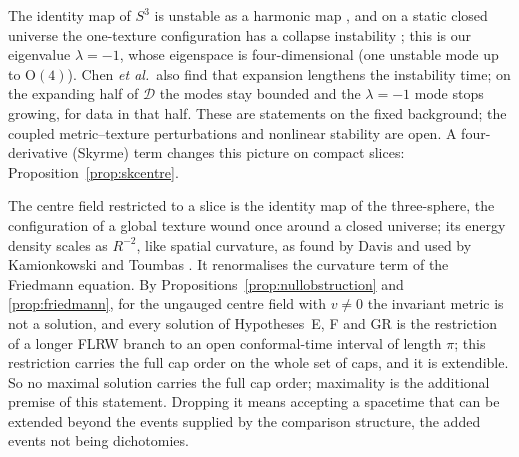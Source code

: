 \documentclass[aps,pra,onecolumn,superscriptaddress,nofootinbib,10pt]{revtex4-2}
\theoremstyle{definition}
\theoremstyle{remark}
\newcommand{\cD}{\mathcal{D}}
\newcommand{\OO}{\mathrm{O}}
\begin{document}
The identity map of $S^3$ is unstable as a harmonic map \cite{SmithHarmonic,Xin80}, and on a static
closed universe the one-texture configuration has a collapse instability \cite{CHKL97}; this is our
eigenvalue $\lambda=-1$, whose eigenspace is four-dimensional (one unstable mode up to $\OO(4)$).  Chen
\emph{et al.}\ also find that expansion lengthens the instability time; on the expanding half of $\cD$ the
modes stay bounded and the $\lambda=-1$ mode stops growing, for data in that half.  These are statements on
the fixed background; the coupled metric--texture perturbations and nonlinear stability are open.  A
four-derivative (Skyrme) term changes this picture on compact slices: Proposition~\ref{prop:skcentre}.

The centre field restricted to a slice is the identity map of the three-sphere, the configuration of
a global texture wound once around a closed universe; its energy density scales as $R^{-2}$, like
spatial curvature, as found by Davis \cite{Davis87,Davis87b} and used by Kamionkowski and Toumbas
\cite{KT96}.  It renormalises the curvature term of the Friedmann equation.  By
Propositions~\ref{prop:nullobstruction} and \ref{prop:friedmann}, for the ungauged centre field with $v\ne0$ the
invariant metric is not a solution, and every solution of Hypotheses~E, F and GR is the restriction of a
longer FLRW branch to an open conformal-time interval of length $\pi$; this restriction carries the full cap
order on the whole set of caps, and it is extendible.  So no maximal solution carries the full cap order;
maximality is the additional premise of this statement.  Dropping it means accepting a spacetime that can
be extended beyond the events supplied by the comparison structure, the added events not being
dichotomies.
\end{document}
